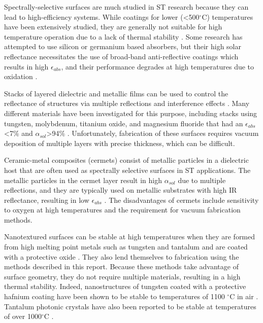 \documentclass[review]{elsarticle}
\begin{document}
Spectrally-selective surfaces are much studied in ST research 
because they can lead to high-efficiency systems.  While coatings for lower (\textless500$^\circ$C) temperatures have been extensively studied, they are generally not suitable for high temperature operation due to a lack of thermal stability \cite{A1}.  Some research has attempted to use silicon or germanium based absorbers, but their high solar reflectance necessitates the use of broad-band anti-reflective coatings which results in high $\epsilon_{abs}$, and their performance degrades at high temperatures due to oxidation \cite{A2}. 

Stacks of layered dielectric and metallic films can be used to control the reflectance of structures via multiple reflections and interference effects \cite{A3}.  Many different materials have been investigated for this purpose, including stacks using tungsten, molybdenum, titanium oxide, and magnesium fluoride that had an $\epsilon_{abs}$\textless7\% and $\alpha_{sol}$\textgreater94\% \cite{paper1_ref7,stacks2, A2}.  Unfortunately, fabrication of these surfaces requires vacuum deposition of multiple layers with precise thickness, which can be difficult.

Ceramic-metal composites (cermets) consist of metallic particles in a dielectric host that are often used as spectrally selective surfaces in ST applications.  The metallic particles in the cermet layer result in high $\alpha_{sol}$ due to multiple reflections, and they are typically used on metallic substrates with high IR reflectance, resulting in low $\epsilon_{abs}$ \cite{A2,A4,A5,A6,A7,A8,A9,A10}.  The disadvantages of cermets include sensitivity to oxygen at high temperatures and the requirement for vacuum fabrication methods.

Nanotextured surfaces can be stable at high temperatures when they are 
formed from high melting point metals such as tungsten and tantalum and are coated with a protective oxide \cite{paper1_ref5}.  They also lend themselves to fabrication using the methods described in this report.  Because these methods take advantage of surface geometry, they do not require multiple materials, resulting in a high thermal stability.  Indeed, nanostructures of tungsten coated with a protective hafnium coating have been shown to be stable to temperatures of 1100 $^\circ$C in air \cite{paper1_ref5,Therm_stabil_W_microstructures}.  Tantalum photonic crystals have also been reported to be stable at temperatures of over 1000$^\circ$C \cite{photonic_crystal_rev}.
\end{document}
